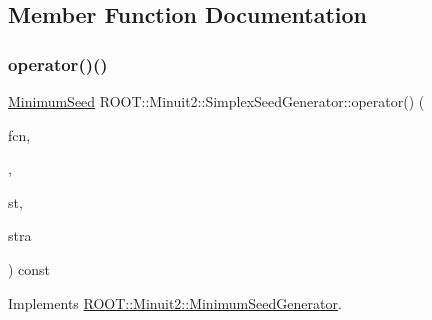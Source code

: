 \subsection{Member Function Documentation}
\mbox{\label{classROOT_1_1Minuit2_1_1SimplexSeedGenerator_aa0c427acb85f9a47a0abaecbf85b1f5c}} 
\subsubsection{\texorpdfstring{operator()()}{operator()()}\hspace{0.1cm}{\footnotesize\ttfamily [1/4]}}
{\footnotesize\ttfamily \mbox{\hyperlink{classROOT_1_1Minuit2_1_1MinimumSeed}{Minimum\+Seed}} R\+O\+O\+T\+::\+Minuit2\+::\+Simplex\+Seed\+Generator\+::operator() (\begin{DoxyParamCaption}\item[{const \mbox{\hyperlink{classROOT_1_1Minuit2_1_1MnFcn}{Mn\+Fcn}} \&}]{fcn,  }\item[{const \mbox{\hyperlink{classROOT_1_1Minuit2_1_1GradientCalculator}{Gradient\+Calculator}} \&}]{,  }\item[{const \mbox{\hyperlink{classROOT_1_1Minuit2_1_1MnUserParameterState}{Mn\+User\+Parameter\+State}} \&}]{st,  }\item[{const \mbox{\hyperlink{classROOT_1_1Minuit2_1_1MnStrategy}{Mn\+Strategy}} \&}]{stra }\end{DoxyParamCaption}) const\hspace{0.3cm}{\ttfamily [virtual]}}



Implements \mbox{\hyperlink{classROOT_1_1Minuit2_1_1MinimumSeedGenerator_ae71de52027d3f0c7fa202c7cf65b947a}{R\+O\+O\+T\+::\+Minuit2\+::\+Minimum\+Seed\+Generator}}.

